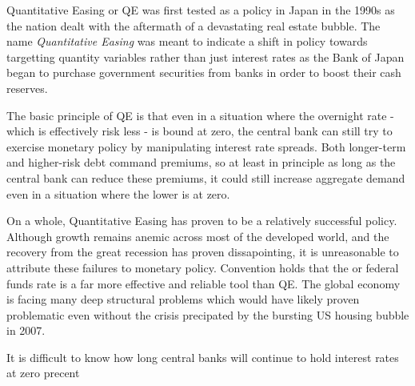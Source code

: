 \documentclass[12pt]{report}
\begin{document}

Quantitative Easing or QE was first tested as a policy in Japan in the 1990s as the nation dealt with the aftermath of a devastating real estate bubble.\autocite[274]{joyce2012quantitative}
The name \emph{Quantitative Easing} was meant to indicate a shift in policy towards targetting quantity variables rather than just interest rates as the Bank of Japan began to purchase government securities from banks in order to boost their cash reserves.\autocite[274]{joyce2012quantitative}

The basic principle of QE is that even in a situation where the overnight rate - which is effectively risk less - is bound at zero, the central bank can still try to exercise monetary policy by manipulating interest rate spreads.\autocite[466]{blinder2010quantitative}
Both longer-term and higher-risk debt command premiums, so at least in principle as long as the central bank can reduce these premiums, it could still increase aggregate demand even in a situation where the lower is at zero.\autocite[466]{blinder2010quantitative}

On a whole, Quantitative Easing has proven to be a relatively successful policy.
Although growth remains anemic across most of the developed world, and the recovery from the great recession has proven dissapointing, it is unreasonable to attribute these failures to monetary policy.
Convention holds that the or federal funds rate is a far more effective and reliable tool than QE.\autocite[465]{blinder2010quantitative}
The global economy is facing many deep structural problems which would have likely proven problematic even without the crisis precipated by the bursting US housing bubble in 2007.

It is difficult to know how long central banks will continue to hold interest rates at zero precent

\begin{appendices}


\end{appendices}

\nocite{*}
\printbibliography
\end{document}
